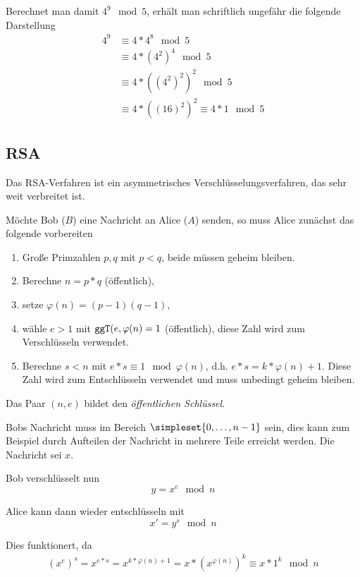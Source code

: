 Berechnet man damit $4^9\mod 5$, erhält man schriftlich ungefähr die folgende Darstellung
\begin{align*}
	4^9&\equiv 4*4^8\mod 5\\
	&\equiv 4*(4^2)^4\mod 5\\
	&\equiv 4*((4^2)^2)^2\mod 5\\
	&\equiv 4*((16)^2)^2\equiv 4*1\mod 5
\end{align*}


\subsection{RSA}
Das RSA-Verfahren ist ein asymmetrisches Verschlüsselungsverfahren, das sehr weit verbreitet ist.

Möchte Bob  ($B$) eine Nachricht an Alice ($A$) senden, so muss Alice zunächst das folgende vorbereiten 
\begin{enumerate}
	\item Große Primzahlen $p,q$ mit $p<q$, beide müssen geheim bleiben.
	\item Berechne $n=p*q$ (öffentlich),
	\item setze $\varphi(n)=(p-1)(q-1)$,
	\item wähle $e>1$ mit $\texttt{ggT}(e,\varphi(n)=1$ (öffentlich), diese Zahl wird zum Verschlüsseln verwendet.
	\item Berechne $s<n$ mit $e*s\equiv 1\mod \varphi(n)$, d.h. $e*s=k*\varphi(n)+1$. Diese Zahl wird zum Entschlüsseln verwendet und muss unbedingt geheim bleiben.
\end{enumerate}
Das Paar $(n,e)$ bildet den \emph{öffentlichen Schlüssel}.

Bobs Nachricht muss im Bereich $\simpleset{0,\ldots,n-1}$ sein, dies kann zum Beispiel durch Aufteilen der Nachricht in mehrere Teile erreicht werden. Die Nachricht sei $x$.

Bob verschlüsselt nun
\begin{equation*}
	y=x^e\mod n
\end{equation*}

Alice kann dann wieder entschlüsseln mit
\begin{equation*}
	x'=y^s\mod n
\end{equation*}

Dies funktionert, da
\begin{align*}
	(x^e)^s = x^{e*s}=x^{k*\varphi(n)+1}=x*(x^{\varphi(n)})^k\equiv x*1^k\mod n
\end{align*}